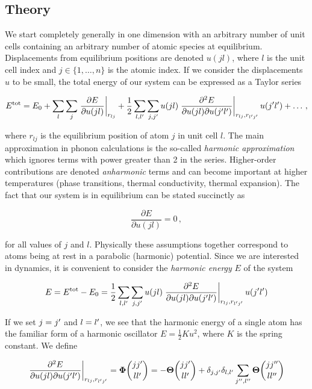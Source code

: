 \subsection{Theory}

We start completely generally in one dimension with an arbitrary number of unit cells containing an arbitrary number of atomic species at equilibrium. Displacements from equilibrium positions are denoted $u(jl)$, where $l$ is the unit cell index and $j \in \{1,\dots,n\}$ is the atomic index. If we consider the displacements $u$ to be small, the total energy of our system can be expressed as a Taylor series

\[ E^\text{tot} = E_0 + \sum_{l}\sum_{j} \left. \frac{\partial E}{\partial u(jl)} \right\rvert_{r_{lj}}  + \frac{1}{2} \sum_{l,l^\prime} \sum_{j,j^\prime} u(jl) \left. \frac{\partial ^2 E}{\partial u(jl) \partial u(j^\prime l^\prime)} \right\rvert_{r_{lj}, r_{l^\prime j^\prime}} u(j^\prime l^\prime) + \dots \, , \]

\noindent where $r_{lj}$ is the equilibrium position of atom $j$ in unit cell $l$. The main approximation in phonon calculations is the so-called \emph{harmonic approximation} which ignores terms with power greater than 2 in the series. Higher-order contributions are denoted \emph{anharmonic} terms and can become important at higher temperatures (phase transitions, thermal conductivity, thermal expansion). The fact that our system is in equilibrium can be stated succinctly as

\[ \frac{\partial E}{\partial u(jl)} = 0 \, , \]

\noindent for all values of $j$ and $l$. Physically these assumptions together correspond to atoms being at rest in a parabolic (harmonic) potential. Since we are interested in  dynamics, it is convenient to consider the \emph{harmonic energy} $E$ of the system

\begin{equation}
E = E^\text{tot} - E_0 = \frac{1}{2} \sum_{l,l^\prime} \sum_{j,j^\prime} u(jl) \left. \frac{\partial ^2 E}{\partial u(jl) \partial u(j^\prime l^\prime)} \right\rvert_{r_{lj}, r_{l^\prime j^\prime}} u(j^\prime l^\prime) \label{eq:eharm}
\end{equation}

\noindent If we set $j=j^\prime$ and $l=l^\prime$, we see that the harmonic energy of a single atom has the familiar form of a harmonic oscillator $E=\frac{1}{2}Ku^2$, where $K$ is the spring constant. We define

\[ \left. \frac{\partial ^2 E}{\partial u(jl) \partial u(\jp \lp)} \right\rvert_{r_{lj}, r_{\lp \jp}} = \fc = \fcbf \]

